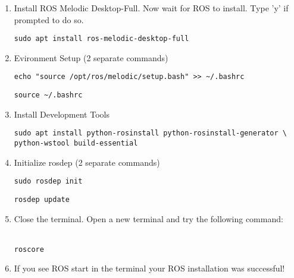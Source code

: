 \documentclass[12pt]{article}
\begin{document}
\begin{enumerate}
	\item Install ROS Melodic Desktop-Full. Now wait for ROS to install. Type 'y' if prompted to do so. 
	\begin{verbatim}
sudo apt install ros-melodic-desktop-full
	\end{verbatim}

\newpage	
	\item Evironment Setup (2 separate commands) 
	\begin{verbatim} 
echo "source /opt/ros/melodic/setup.bash" >> ~/.bashrc
	\end{verbatim}
	\begin{verbatim} 
source ~/.bashrc 
	\end{verbatim}


\item Install Development Tools 
\begin{verbatim} 
sudo apt install python-rosinstall python-rosinstall-generator \ 
python-wstool build-essential
\end{verbatim}
	
	\item Initialize rosdep (2 separate commands) 
	\begin{verbatim}
sudo rosdep init
	\end{verbatim}
	\begin{verbatim} 
rosdep update
	\end{verbatim}



		


		\item Close the terminal. Open a new terminal and try the following command:\\\\
\begin{verbatim}  
roscore 
\end{verbatim}

		\item If you see ROS start in the terminal your ROS installation was successful!\\\\

\end{enumerate}
\end{document}
